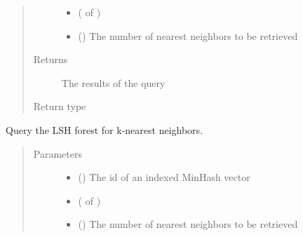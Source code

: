 \documentclass[letterpaper,10pt,english]{sphinxmanual}
\begin{document}
\begin{fulllineitems}
\begin{fulllineitems}
\begin{quote}
\begin{description}
\begin{itemize}
\item {} 
 ( of ) \textendash{} 

\item {} 
 () \textendash{} The number of nearest neighbors to be retrieved

\end{itemize}

\item[{Returns}] \leavevmode
The results of the query

\item[{Return type}] \leavevmode
{}

\end{description}\end{quote}

\end{fulllineitems}


\begin{fulllineitems}
\label{\detokenize{documentation:tmap.LSHForest.query_exclude_by_id}}
Query the LSH forest for k-nearest neighbors.
\begin{quote}\begin{description}
\item[{Parameters}] \leavevmode\begin{itemize}
\item {} 
 () \textendash{} The id of an indexed MinHash vector

\item {} 
 ( of ) \textendash{} 

\item {} 
 () \textendash{} The number of nearest neighbors to be retrieved

\end{itemize}


\end{description}
\end{quote}
\end{fulllineitems}
\end{fulllineitems}
\end{document}
